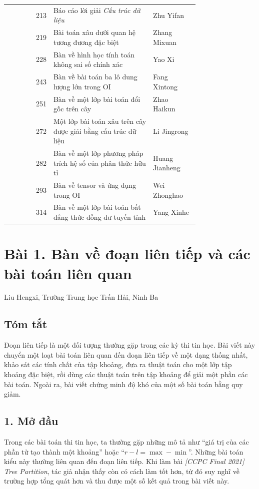 \documentclass[11pt]{article}
\begin{document}
\begin{center}
\begin{tabular}{r p{0.52\linewidth} p{0.24\linewidth}}
213 & Báo cáo lời giải \emph{Cấu trúc dữ liệu} & Zhu Yifan \\
219 & Bài toán xâu dưới quan hệ tương đương đặc biệt & Zhang Mixuan \\
228 & Bàn về hình học tính toán không sai số chính xác & Yao Xi \\
243 & Bàn về bài toán ba lô dung lượng lớn trong OI & Fang Xintong \\
251 & Bàn về một lớp bài toán đổi gốc trên cây & Zhao Haikun \\
272 & Một lớp bài toán xâu trên cây được giải bằng cấu trúc dữ liệu & Li Jingrong \\
282 & Bàn về một lớp phương pháp trích hệ số của phân thức hữu tỉ & Huang Jianheng \\
293 & Bàn về tensor và ứng dụng trong OI & Wei Zhonghao \\
314 & Bàn về một lớp bài toán bất đẳng thức đồng dư tuyến tính & Yang Xinhe
\end{tabular}
\end{center}

\section*{Bài 1. Bàn về đoạn liên tiếp và các bài toán liên quan}

\begin{center}
Liu Hengxi, Trường Trung học Trấn Hải, Ninh Ba
\end{center}

\subsection*{Tóm tắt}

Đoạn liên tiếp là một đối tượng thường gặp trong các kỳ thi tin học. Bài viết
này chuyển một loạt bài toán liên quan đến đoạn liên tiếp về một dạng thống
nhất, khảo sát các tính chất của tập khoảng, đưa ra thuật toán cho một lớp tập
khoảng đặc biệt, rồi dùng các thuật toán trên tập khoảng để giải một phần các
bài toán. Ngoài ra, bài viết chứng minh độ khó của một số bài toán bằng quy
giảm.

\subsection*{1. Mở đầu}

Trong các bài toán thi tin học, ta thường gặp những mô tả như ``giá trị của
các phần tử tạo thành một khoảng'' hoặc ``$r-l=\max-\min$''. Những bài toán
kiểu này thường liên quan đến đoạn liên tiếp. Khi làm bài \emph{[CCPC Final
2021] Tree Partition}, tác giả nhận thấy còn có cách làm tốt hơn, từ đó suy
nghĩ về trường hợp tổng quát hơn và thu được một số kết quả trong bài viết này.
\end{document}
